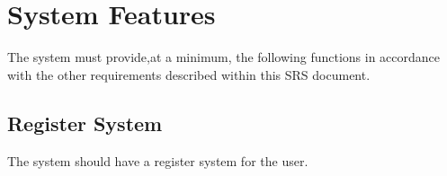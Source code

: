 \documentclass{scrreprt}
\begin{document}
\chapter{System Features}
The system must provide,at a minimum, the following functions
in accordance with the other requirements described within
this SRS document.

\section{Register System}
The system should have a register system for the user.



\end{document}
